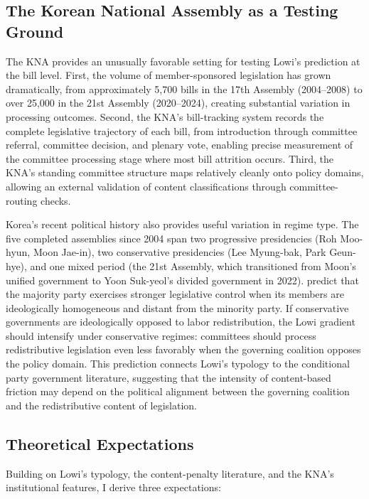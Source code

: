 \documentclass[11pt]{article}
\begin{document}
\subsection{The Korean National Assembly as a Testing Ground}
\label{sec:lit-kna}

The KNA provides an unusually favorable setting for testing Lowi's prediction at the bill level. First, the volume of member-sponsored legislation has grown dramatically, from approximately 5,700 bills in the 17th Assembly (2004--2008) to over 25,000 in the 21st Assembly (2020--2024), creating substantial variation in processing outcomes. Second, the KNA's bill-tracking system records the complete legislative trajectory of each bill, from introduction through committee referral, committee decision, and plenary vote, enabling precise measurement of the committee processing stage where most bill attrition occurs. Third, the KNA's standing committee structure maps relatively cleanly onto policy domains, allowing an external validation of content classifications through committee-routing checks.

Korea's recent political history also provides useful variation in regime type. The five completed assemblies since 2004 span two progressive presidencies (Roh Moo-hyun, Moon Jae-in), two conservative presidencies (Lee Myung-bak, Park Geun-hye), and one mixed period (the 21st Assembly, which transitioned from Moon's unified government to Yoon Suk-yeol's divided government in 2022). \citet{aldrich2001} predict that the majority party exercises stronger legislative control when its members are ideologically homogeneous and distant from the minority party. If conservative governments are ideologically opposed to labor redistribution, the Lowi gradient should intensify under conservative regimes: committees should process redistributive legislation even less favorably when the governing coalition opposes the policy domain. This prediction connects Lowi's typology to the conditional party government literature, suggesting that the intensity of content-based friction may depend on the political alignment between the governing coalition and the redistributive content of legislation.

\subsection{Theoretical Expectations}
\label{sec:lit-expect}

Building on Lowi's typology, the content-penalty literature, and the KNA's institutional features, I derive three expectations:
\end{document}
